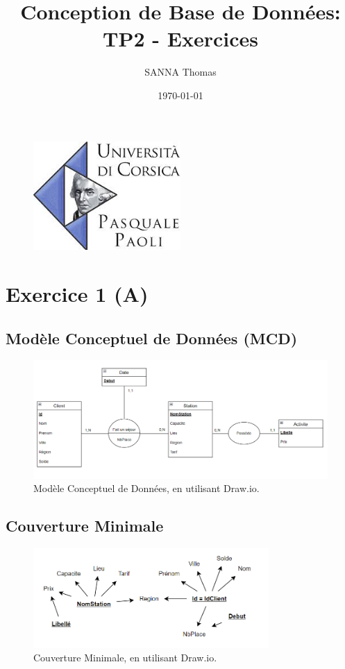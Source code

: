 \documentclass{article}
\title{Conception de Base de Données: \\ TP2 - Exercices}
\author{SANNA Thomas}
\date{\today}
\begin{document}
\begin{figure}
  \centering
  \includegraphics[width=0.5\textwidth]{img/logoUniv.jpg}
  \label{fig:mysql-logo}
\end{figure}

\maketitle

\break\tableofcontents

\break\section{Exercice 1 (A)}

\subsection{Modèle Conceptuel de Données (MCD)}

\begin{figure}[H]
  \centering
  \includegraphics[width=1\textwidth]{imgMcd/mcd.png}
  \caption{Modèle Conceptuel de Données, en utilisant Draw.io.}
  \label{fig:MCD}
\end{figure}

\subsection{Couverture Minimale}

\begin{figure}[H]
  \centering
  \includegraphics[width=0.8\textwidth]{imgMcd/couvMin.png}
  \caption{Couverture Minimale, en utilisant Draw.io.}
  \label{fig:CM}
\end{figure}
\end{document}
